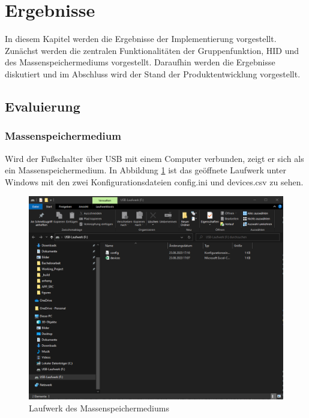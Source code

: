 \section{Ergebnisse}
\label{Ergebnisse}
In diesem Kapitel werden die Ergebnisse der Implementierung vorgestellt. Zunächst werden die zentralen Funktionalitäten der Gruppenfunktion, \ac{HID} und des Massenspeichermediums vorgestellt. Daraufhin werden die Ergebnisse diskutiert und im Abschluss wird der Stand der Produktentwicklung vorgestellt.

\subsection{Evaluierung}

\subsubsection{Massenspeichermedium}
Wird der Fußschalter über \ac{USB} mit einem Computer verbunden, zeigt er sich als ein Massenspeichermedium. In Abbildung \ref{fig:LaufwerkMassenspeichermediums} ist das geöffnete Laufwerk unter Windows mit den zwei Konfigurationsdateien config.ini und devices.csv zu sehen.
\begin{figure}[H] 
	\centering
	\includegraphics[width=\textwidth]{figures/Laufwerk.png}
	\caption{Laufwerk des Massenspeichermediums}
	\label{fig:LaufwerkMassenspeichermediums}
\end{figure}

